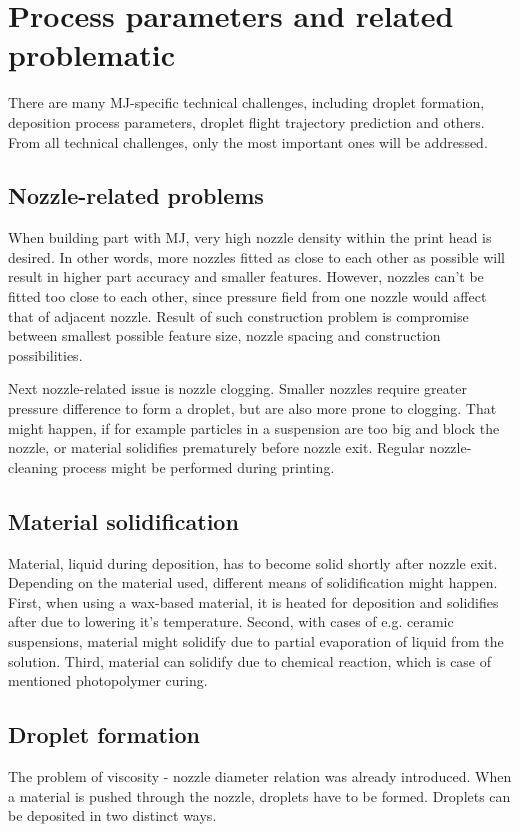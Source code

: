 \documentclass[a4paper, 11pt, reqno]{report}
\begin{document}
\section{Process parameters and related problematic}
There are many MJ-specific technical challenges, including droplet formation, deposition process parameters, droplet flight trajectory prediction and others. From all technical challenges, only the most important ones will be addressed.

\subsection{Nozzle-related problems}
When building part with MJ, very high nozzle density within the print head is desired. In other words, more nozzles fitted as close to each other as possible will result in higher part accuracy and smaller features. However, nozzles can't be fitted too close to each other, since pressure field from one nozzle would affect that of adjacent nozzle. Result of such construction problem is compromise between smallest possible feature size, nozzle spacing and construction possibilities.

	Next nozzle-related issue is nozzle clogging. Smaller nozzles require greater pressure difference to form a droplet, but are also more prone to clogging. That might happen, if for example particles in a suspension are too big and block the nozzle, or material solidifies prematurely before nozzle exit. Regular nozzle-cleaning process might be performed during printing.

\subsection{Material solidification}
Material, liquid during deposition, has to become solid shortly after nozzle exit. Depending on the material used, different means of solidification might happen. First, when using a wax-based material, it is heated for deposition and solidifies after due to lowering it's temperature. Second, with cases of e.g. ceramic suspensions, material might solidify due to partial evaporation of liquid from the solution. Third, material can solidify due to chemical reaction, which is case of  mentioned photopolymer curing.

\subsection{Droplet formation}
The problem of viscosity - nozzle diameter relation was already introduced. When a material is pushed through the nozzle, droplets have to be formed. Droplets can be deposited in two distinct ways.
\end{document}
